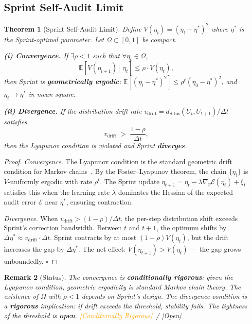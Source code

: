 \documentclass[12pt,a4paper]{article}
\newtheorem{theorem}{Theorem}[section]
\newtheorem{remark}[theorem]{Remark}
\newcommand{\conditionallyrigorous}{\textcolor{orange}{\small\textsf{[Conditionally Rigorous]}}}
\newcommand{\openquest}{\textcolor{red!70!black}{\small\textsf{[Open]}}}
\newcommand{\E}{\mathbb{E}}
\newcommand{\Situs}{\mathrm{Situs}}
\begin{document}
\subsection{Sprint Self-Audit Limit}

\begin{theorem}[Sprint Self-Audit Limit]
\label{thm:sprint-limit}
Define $V(\eta_t) = (\eta_t - \eta^*)^2$ where $\eta^*$ is the
Sprint-optimal parameter.  Let $\Omega \subset [0,1]$ be compact.

\textbf{(i) Convergence.}  If $\exists \rho < 1$ such that
$\forall \eta_t \in \Omega$,
\begin{equation}\label{eq:lyapunov-condition}
    \E[V(\eta_{t+1}) \mid \eta_t] \leq \rho \cdot V(\eta_t),
\end{equation}
then Sprint is \textbf{geometrically ergodic}:
$\E[(\eta_t - \eta^*)^2] \leq \rho^t (\eta_0 - \eta^*)^2$, and
$\eta_t \to \eta^*$ in mean square.

\textbf{(ii) Divergence.}  If the distribution drift rate
$v_{\mathrm{drift}} = d_{\Situs}(U_t, U_{t+1}) / \Delta t$ satisfies
\begin{equation}\label{eq:divergence-condition}
    v_{\mathrm{drift}} \;>\; \frac{1 - \rho}{\Delta t},
\end{equation}
then the Lyapunov condition is violated and Sprint \textbf{diverges}.
\end{theorem}

\begin{proof}
\textit{Convergence.}  The Lyapunov condition is the standard geometric
drift condition for Markov chains~\citep{meyn2012markov}.  By the
Foster--Lyapunov theorem, the chain $\{\eta_t\}$ is $V$-uniformly ergodic
with rate $\rho^t$.  The Sprint update
$\eta_{t+1} = \eta_t - \lambda \nabla_\eta \mathcal{E}(\eta_t) + \xi_t$
satisfies this when the learning rate $\lambda$ dominates the Hessian of
the expected audit error $\mathcal{E}$ near $\eta^*$, ensuring contraction.

\textit{Divergence.}  When $v_{\mathrm{drift}} > (1-\rho)/\Delta t$, the
per-step distribution shift exceeds Sprint's correction bandwidth.
Between $t$ and $t+1$, the optimum shifts by
$\Delta\eta^* \approx v_{\mathrm{drift}} \cdot \Delta t$.  Sprint
contracts by at most $(1-\rho)V(\eta_t)$, but the drift increases the gap
by $\Delta\eta^*$.  The net effect: $V(\eta_{t+1}) > V(\eta_t)$ —
the gap grows unboundedly.  $\square$
\end{proof}

\begin{remark}[Status]
The convergence is \textbf{conditionally rigorous}: given the Lyapunov
condition, geometric ergodicity is standard Markov chain theory.  The
existence of $\Omega$ with $\rho < 1$ depends on Sprint's design.  The
divergence condition is a \textbf{rigorous} implication: if drift exceeds
the threshold, stability fails.  The \emph{tightness} of the threshold
is \textbf{open}.  \conditionallyrigorous~/ \openquest
\end{remark}
\end{document}
